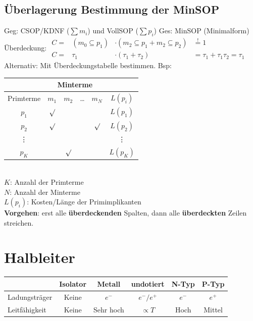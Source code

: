 \documentclass[6pt,a4paper]{scrartcl}
\begin{document}
\begin{multicols*}{3}
	\subsection{Überlagerung Bestimmung der MinSOP}
	Geg: CSOP/KDNF ($\sum m_i$) und VollSOP ($\sum p_i$) \qquad Ges: MinSOP (Minimalform)\\
	Überdeckung: $\begin{array}{rccl} C = & (m_0 \subseteq p_1) & \cdot (m_2 \subseteq p_1 + m_2 \subseteq p_2) & \stackrel{!}=1 \\ C = & \tau_1 & \cdot (\tau_1 + \tau_2) & = \tau_1 + \tau_1 \tau_2 = \tau_1 \end{array}$ \\
	Alternativ: Mit Überdeckungstabelle bestimmen. Bsp:\\
	\begin{tabular}{|c|c|c|c|c|c|}
		\hline
		          &      \multicolumn{4}{c|}{Minterme}  &      \\ \hline
		Primterme &  $m_1$  &  $m_2$  & \dots &  $m_N$  & $L(p_i)$   \\ \bottomrule[1pt]
		  $p_1$   & $\surd$ &         &       &         & $L(p_1)$   \\ \hline
		  $p_2$   & $\surd$ &         &       & $\surd$ & $L(p_2)$   \\ \hline
		 \vdots   &         &         &       &         &  \vdots    \\ \hline
		  $p_K$   &         & $\surd$ &       &         & $L(p_K)$   \\ \hline
	\end{tabular} \\
	$K$: Anzahl der Primterme\\
	$N$: Anzahl der Minterme \\
	$L(p_i)$: Kosten/Länge der Primimplikanten\\
	\textbf{Vorgehen}: erst alle \textbf{überdeckenden} Spalten, dann alle \textbf{überdeckten} Zeilen streichen.
	
\section{Halbleiter}
\begin{tabular}{l|c|c|c|c|c}
	& Isolator & Metall & undotiert & N-Typ & P-Typ \\ \hline
	Ladungsträger & Keine & $e^-$ & $e^- / e^+$ & $e^-$ & $e^+$ \\
	Leitfähigkeit & Keine & Sehr hoch & $\propto T$ & Hoch & Mittel\\  
\end{tabular}


\end{multicols*}
\end{document}

